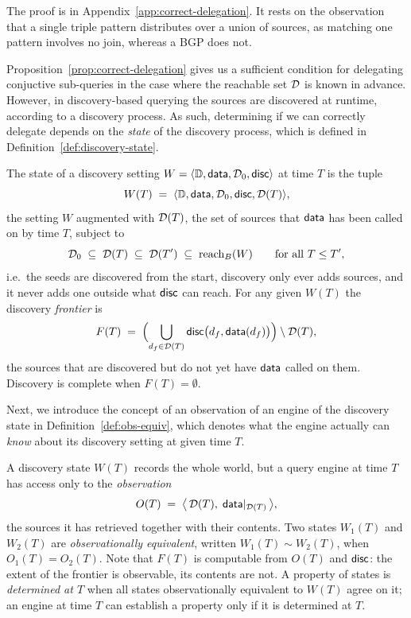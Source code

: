 The proof is in Appendix~\ref{app:correct-delegation}. It rests on the observation that a
single triple pattern distributes over a union of sources, as matching one pattern
involves no join, whereas a BGP does not.

Proposition~\ref{prop:correct-delegation} gives us a sufficient condition for delegating 
conjuctive sub-queries in the case where the reachable set $\mathcal{D}$ is known in advance. 
However, in discovery-based querying the sources are discovered at runtime, according to a discovery process.
As such, determining if we can correctly delegate depends on the
\emph{state} of the discovery process, which is defined in Definition~\ref{def:discovery-state}.

\begin{definition}
  \label{def:discovery-state}
  The state of a discovery setting $W = \langle \mathbb{D}, \mathsf{data}, \mathcal{D}_0, \mathsf{disc} \rangle$ at
  time $T$ is the tuple
  \[
    W(T) \;=\; \langle \mathbb{D}, \mathsf{data}, \mathcal{D}_0, \mathsf{disc}, \mathcal{D}(T) \rangle,
  \]
  the setting $W$ augmented with $\mathcal{D}(T)$, the set of sources that $\mathsf{data}$ has been
  called on by time $T$, subject to
  \[
    \mathcal{D}_0 \;\subseteq\; \mathcal{D}(T) \;\subseteq\; \mathcal{D}(T') \;\subseteq\; \mathrm{reach}_B(W)
    \qquad \text{for all } T \leq T',
  \]
  i.e.\ the seeds are discovered from the start, discovery only ever adds sources, and
  it never adds one outside what $\mathsf{disc}$ can reach. For any given $W(T)$ the discovery
  \emph{frontier} is
  \[
    F(T) \;=\; \Bigl( \bigcup_{d_f \in \mathcal{D}(T)} \mathsf{disc}\bigl(d_f, \mathsf{data}(d_f)\bigr) \Bigr)
                \setminus \mathcal{D}(T),
  \]
  the sources that are discovered but do not yet have $\mathsf{data}$ called on them.
  Discovery is complete when $F(T) = \emptyset$.
\end{definition}

Next, we introduce the concept of an observation of an engine of the discovery state 
in Definition~\ref{def:obs-equiv}, which
denotes what the engine actually can \emph{know} about its discovery setting at given time $T$.

\begin{definition}
  \label{def:obs-equiv}
  A discovery state $W(T)$ records the whole world, but a query engine at time $T$ has
  access only to the \emph{observation}
  \[
    O(T) \;=\; \bigl\langle\, \mathcal{D}(T),\; \mathsf{data}|_{\mathcal{D}(T)} \,\bigr\rangle,
  \]
  the sources it has retrieved together with their contents. 
  Two states $W_1(T)$ and $W_2(T)$ are \emph{observationally equivalent}, written
  $W_1(T) \sim W_2(T)$, when $O_1(T) = O_2(T)$. Note that $F(T)$ is computable from
  $O(T)$ and $\mathsf{disc}$: the extent of the frontier is observable, its contents are not. A
  property of states is \emph{determined at $T$} when all states observationally
  equivalent to $W(T)$ agree on it; an engine at time $T$ can establish a property only
  if it is determined at $T$.
\end{definition}

